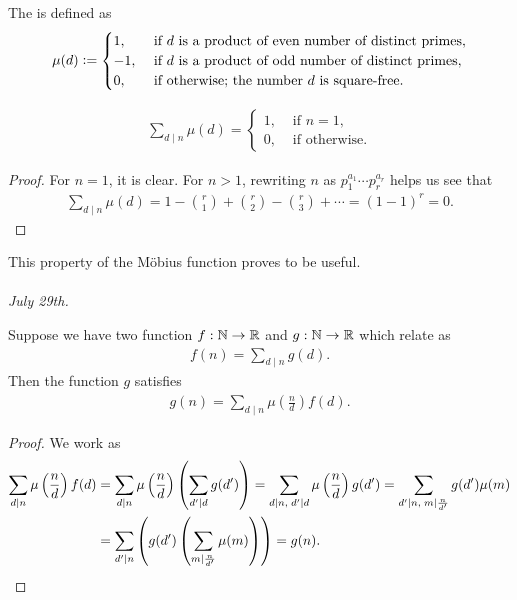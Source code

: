 The  is defined as
\begin{equation}
    \mu(d) \vcentcolon= \begin{cases}
        1, &\text{ if } d \text{ is a product of even number of distinct primes},\\
        -1, &\text{ if } d \text{ is a product of odd number of distinct primes},\\
        0, &\text{ if otherwise; the number } d \text{ is square-free.}
    \end{cases}
\end{equation}

\begin{theorem}
    \begin{align}
        \sum_{d \mid n} \mu(d) = \begin{cases}
            1, &\text{ if } n = 1,\\
            0, &\text{ if otherwise.}
        \end{cases}
    \end{align}
\end{theorem}

\begin{proof}
    For $n = 1$, it is clear. For $n > 1$, rewriting $n$ as $p_{1}^{a_{1}} \cdots p_{r}^{a_{r}}$ helps us see that
    \begin{align}
        \sum_{d \mid n} \mu(d) = 1 - \binom{r}{1} + \binom{r}{2} - \binom{r}{3} + \cdots = (1-1)^{r} = 0.
    \end{align}
\end{proof}

This property of the M\"obius function proves to be useful.\\ \\
\textit{July 29th.}

\begin{theorem}
    Suppose we have two function $f: \mathbb{N} \to \mathbb{R}$ and $g:\mathbb{N} \to \mathbb{R}$ which relate as
    \begin{align}
        f(n) = \sum_{d \mid n} g(d).
    \end{align}
    Then the function $g$ satisfies
    \begin{align}
        g(n) = \sum_{d \mid n} \mu\left( \frac{n}{d} \right)f(d).
    \end{align}
\end{theorem}

\begin{proof}
    We work as
    \begin{align}
        \sum_{d \mid n} \mu \left( \frac{n}{d} \right) f(d) &= \sum_{d \mid n} \mu\left(  \frac{n}{d} \right) \left( \sum_{d'\mid d} g(d') \right) = \sum_{d \mid n,\; d'\mid d} \mu \left( \frac{n}{d} \right) g(d') = \sum_{d' \mid n,\; m \mid \frac{n}{d'}} g(d') \mu(m) \notag \\
        &= \sum_{d' \mid n} \left( g(d') \left( \sum_{m \mid \frac{n}{d'}} \mu(m) \right) \right) = g(n).
    \end{align}
\end{proof}

